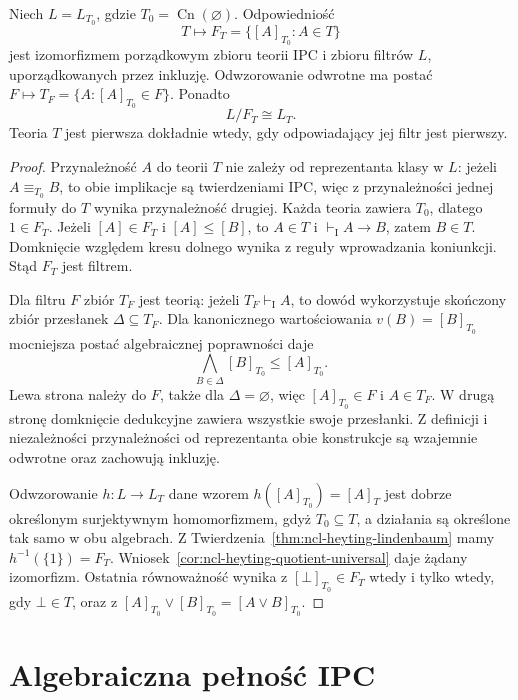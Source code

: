 \begin{stwierdzenie}
\label{prop:ncl-heyting-theories-filters}
Niech $L=L_{T_0}$, gdzie
$T_0=\operatorname{Cn}(\varnothing)$.
Odpowiedniość
\[
 T\longmapsto F_T=\{[A]_{T_0}:A\in T\}
\]
jest izomorfizmem porządkowym zbioru teorii IPC
i zbioru filtrów $L$, uporządkowanych przez inkluzję.
Odwzorowanie odwrotne ma postać
$F\longmapsto T_F=\{A:[A]_{T_0}\in F\}$.
Ponadto
\[
 L/F_T\cong L_T.
\]
Teoria $T$ jest pierwsza dokładnie wtedy,
gdy odpowiadający jej filtr jest pierwszy.
\end{stwierdzenie}
\begin{proof}
Przynależność $A$ do teorii $T$ nie zależy od
reprezentanta klasy w $L$: jeżeli
$A\equiv_{T_0}B$, to obie implikacje są
twierdzeniami IPC, więc z przynależności jednej
formuły do $T$ wynika przynależność drugiej.
Każda teoria zawiera $T_0$, dlatego $1\in F_T$.
Jeżeli $[A]\in F_T$ i $[A]\leq[B]$, to
$A\in T$ i $\vdash_{\mathrm I}A\to B$,
zatem $B\in T$. Domknięcie względem kresu
dolnego wynika z reguły wprowadzania koniunkcji.
Stąd $F_T$ jest filtrem.

Dla filtru $F$ zbiór $T_F$ jest teorią:
jeżeli $T_F\vdash_{\mathrm I}A$, to dowód
wykorzystuje skończony zbiór przesłanek
$\Delta\subseteq T_F$. Dla kanonicznego
wartościowania $v(B)=[B]_{T_0}$ mocniejsza
postać algebraicznej poprawności daje
\[
 \bigwedge_{B\in\Delta}[B]_{T_0}\leq[A]_{T_0}.
\]
Lewa strona należy do $F$, także dla
$\Delta=\varnothing$, więc $[A]_{T_0}\in F$
i $A\in T_F$. W drugą stronę domknięcie
dedukcyjne zawiera wszystkie swoje przesłanki.
Z definicji i niezależności przynależności
od reprezentanta obie konstrukcje są wzajemnie
odwrotne oraz zachowują inkluzję.

Odwzorowanie $h:L\to L_T$ dane wzorem
$h([A]_{T_0})=[A]_T$ jest dobrze określonym
surjektywnym homomorfizmem, gdyż $T_0\subseteq T$,
a działania są określone tak samo w obu algebrach.
Z Twierdzenia~\ref{thm:ncl-heyting-lindenbaum}
mamy $h^{-1}(\{1\})=F_T$.
Wniosek~\ref{cor:ncl-heyting-quotient-universal}
daje żądany izomorfizm.
Ostatnia równoważność wynika z
$[\bot]_{T_0}\in F_T$ wtedy i tylko wtedy,
gdy $\bot\in T$, oraz z
$[A]_{T_0}\vee[B]_{T_0}=[A\vee B]_{T_0}$.
\end{proof}

\section{Algebraiczna pełność IPC}

